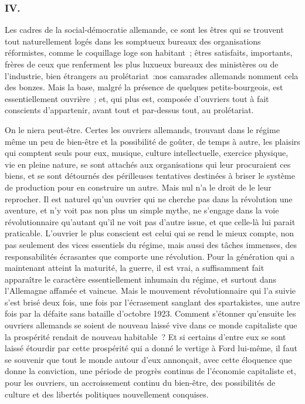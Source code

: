 \documentclass[french,twoside]{book} %
\begin{document}
\subsubsection[IV.]{IV.}
\noindent Les cadres de la social-démocratie allemande, ce sont les êtres qui se trouvent tout naturellement logés dans les somptueux bureaux des organi­sations réformistes, comme le coquillage loge son habitant ; êtres satisfaits, importants, frères de ceux que renferment les plus luxueux bureaux des ministères ou de l'industrie, bien étrangers au prolétariat :nos camarades allemands nomment cela des bonzes. Mais la base, malgré la présence de quelques petits-bourgeois, est essentiellement ouvrière ; et, qui plus est, composée d'ouvriers tout à fait conscients d'appartenir, avant tout et par-dessus tout, au prolétariat.\par
On le niera peut-être. Certes les ouvriers allemands, trouvant dans le régime même un peu de bien-être et la possibilité de goûter, de temps à autre, les plaisirs qui comptent seuls pour eux, musique, culture intellectuelle, exer­cice physique, vie en pleine nature, se sont attachés aux organisations qui leur procuraient ces biens, et se sont détournés des périlleuses tentatives destinées à briser le système de production pour en construire un autre. Mais nul n'a le droit de le leur reprocher. Il est naturel qu'un ouvrier qui ne cherche pas dans la révolution une aventure, et n'y voit pas non plus un simple mythe, ne s'engage dans la voie révolutionnaire qu'autant qu'il ne voit pas d'autre issue, et que celle-là lui parait praticable. L'ouvrier le plus conscient est celui qui se rend le mieux compte, non pas seulement des vices essentiels du régime, mais aussi des tâches immenses, des responsabilités écrasantes que comporte une révolution. Pour la génération qui a maintenant atteint la maturité, la guerre, il est vrai, a suffisamment fait apparaître le caractère essentiellement inhumain du régime, et surtout dans l'Allemagne affamée et vaincue. Mais le mouve­ment révolutionnaire qui l'a suivie s'est brisé deux fois, une fois par l'écrase­ment sanglant des spartakistes, une autre fois par la défaite sans bataille d'octobre 1923. Comment s'étonner qu'ensuite les ouvriers allemands se soient de nouveau laissé vive dans ce monde capitaliste que la prospérité rendait de nouveau habitable ? Et si certains d'entre eux se sont laissé étourdir par cette prospérité qui a donné le vertige à Ford lui-même, il faut se souvenir que tout le monde autour d'eux annonçait, avec cette éloquence que donne la convic­tion, une période de progrès continus de l'économie capitaliste et, pour les ouvriers, un accroissement continu du bien-être, des possibilités de culture et des libertés politiques nouvellement conquises.\par
\end{document}
